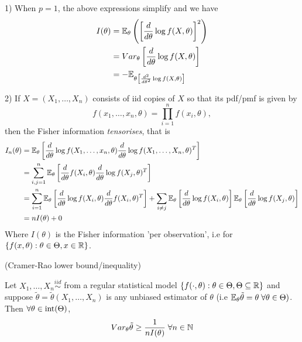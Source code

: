 \documentclass[a4paper]{article}
\begin{document}
\begin{remark}
\item[1)] When $p=1$, the above expressions simplify and we have
	\begin{align*}
		I(\theta) &= \mathbb{E}_{\theta} \left( \left[ \frac{d}{d \theta} \log f(X, \theta) \right]^2  \right)  \\
		&= Var_{\theta} \left[ \frac{d}{d \theta} \log f(X, \theta) \right]  \\
		&= -\mathbb{E}_{\theta \left[ \frac{d^2}{d \theta^2} \log f(X, \theta) \right] }
	\end{align*}

\item[2)] If $X = (X_1, \ldots, X_n)$ consists of iid copies of $X$ so that its pdf/pmf is given by  \[f(x_1, \ldots, x_n, \theta) = \prod_{i=1}^{n} f(x_i, \theta),\]
	then the Fisher information \textit{tensorises}, that is 
	\begin{align*}
		I_n(\theta) &= \mathbb{E}_{\theta}\left[ \frac{d}{d \theta} \log f(X_1, \ldots, x_n, \theta) \frac{d}{d\theta} \log f(X_1, \ldots, X_n, \theta)^{T} \right] \\
		&= \sum_{i,j = 1}^{ n} \mathbb{E}_{\theta} \left[ \frac{d}{d \theta} f(X_{i}, \theta) \frac{d}{d \theta} \log f(X_j, \theta)^{T} \right]  \\
		&= \sum_{i=1}^{n} \mathbb{E}_{\theta} \left[ \frac{d}{d \theta} \log f(X_i, \theta) \frac{d}{d\theta} f(X_i, \theta)^{T} \right] + \sum_{i\neq j} \mathbb{E}_{\theta} \left[ \frac{d}{d\theta} \log f(X_i, \theta) \right] \mathbb{E}_{\theta}\left[ \frac{d}{d\theta} \log f(X_j, \theta) \right]  \\
		&= nI(\theta) + 0
	\end{align*}
	Where $I(\theta)$ is the Fisher information 'per observation', i.e for $\{f(x, \theta) : \theta \in \Theta, x \in \mathbb{R}\} $.
\end{remark}

\newpage

\begin{prop}
	(Cramer-Rao lower bound/inequality)

	Let $X_1, \ldots, X_n \stackrel{iid}{\sim}$ from a regular statistical model $\{f(\cdot , \theta) : \theta \in \Theta, \Theta \subseteq \mathbb{R}\}$ and suppose $\tilde{\theta} = \tilde{\theta}(X_1, \ldots, X_n)$ is any unbiased estimator of $\theta$ (i.e $\mathbb{E}_{\theta} \tilde{\theta} = \theta \; \forall \theta \in \Theta)$. Then $\forall \theta \in \operatorname{int}(\Theta)$,
	\[
		Var_{\theta} \tilde{\theta} \ge \frac{1}{nI(\theta)} \;  \forall n \in  \mathbb{N}
	\] 
\end{prop}
\end{document}
